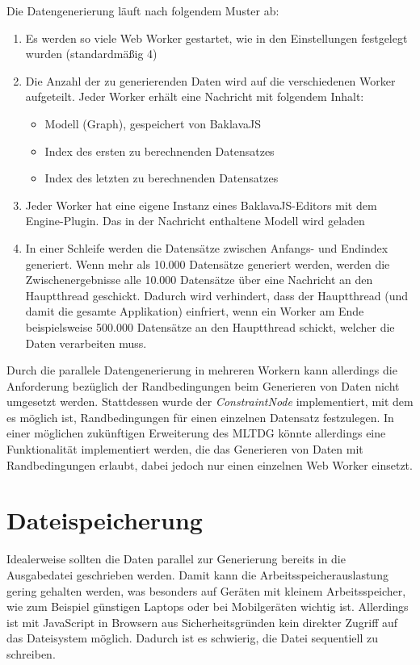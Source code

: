 Die Datengenerierung läuft nach folgendem Muster ab:

\begin{enumerate}
    \item Es werden so viele Web Worker gestartet, wie in den Einstellungen festgelegt wurden (standardmäßig 4)
    \item Die Anzahl der zu generierenden Daten wird auf die verschiedenen Worker aufgeteilt. Jeder Worker erhält eine Nachricht mit folgendem Inhalt:
    \begin{itemize}
        \item Modell (Graph), gespeichert von BaklavaJS
        \item Index des ersten zu berechnenden Datensatzes
        \item Index des letzten zu berechnenden Datensatzes
    \end{itemize}
    \item Jeder Worker hat eine eigene Instanz eines BaklavaJS-Editors mit dem Engine-Plugin. Das in der Nachricht enthaltene Modell wird geladen
    \item In einer Schleife werden die Datensätze zwischen Anfangs- und Endindex generiert. Wenn mehr als 10.000 Datensätze generiert werden, werden die Zwischenergebnisse alle 10.000 Datensätze über eine Nachricht an den Hauptthread geschickt. Dadurch wird verhindert, dass der Hauptthread (und damit die gesamte Applikation) einfriert, wenn ein Worker am Ende beispielsweise 500.000 Datensätze an den Hauptthread schickt, welcher die Daten verarbeiten muss.
\end{enumerate}

Durch die parallele Datengenerierung in mehreren Workern kann allerdings die Anforderung bezüglich der Randbedingungen beim Generieren von Daten nicht umgesetzt werden. Stattdessen wurde der \textit{ConstraintNode} implementiert, mit dem es möglich ist, Randbedingungen für einen einzelnen Datensatz festzulegen. In einer möglichen zukünftigen Erweiterung des \ac{MLTDG} könnte allerdings eine Funktionalität implementiert werden, die das Generieren von Daten mit Randbedingungen erlaubt, dabei jedoch nur einen einzelnen Web Worker einsetzt.

\section{Dateispeicherung}

Idealerweise sollten die Daten parallel zur Generierung bereits in die Ausgabedatei geschrieben werden. Damit kann die Arbeitsspeicherauslastung gering gehalten werden, was besonders auf Geräten mit kleinem Arbeitsspeicher, wie zum Beispiel günstigen Laptops oder bei Mobilgeräten wichtig ist. Allerdings ist mit JavaScript in Browsern aus Sicherheitsgründen kein direkter Zugriff auf das Dateisystem möglich. Dadurch ist es schwierig, die Datei sequentiell zu schreiben.


